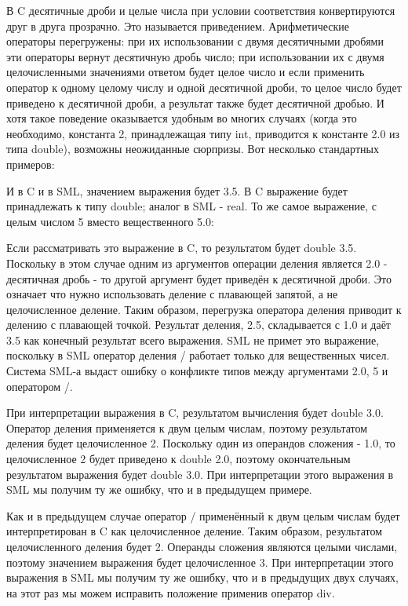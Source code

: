 В C десятичные дроби и целые числа при условии соответствия конвертируются друг в друга прозрачно. Это называется приведением. Арифметические операторы перегружены: при их использовании с двумя десятичными дробями эти операторы вернут десятичную дробь число; при использовании их с двумя целочисленными значениями ответом будет целое число и если применить оператор к одному целому числу и одной десятичной дроби, то целое число будет приведено к десятичной дроби, а результат также будет десятичной дробью. И хотя такое поведение оказывается удобным во многих случаях (когда это необходимо, константа 2, принадлежащая типу int, приводится к константе 2.0 из типа double), возможны неожиданные сюрпризы. Вот несколько стандартных примеров:

И в C и в SML, значением выражения будет 3.5. В C выражение будет принадлежать к типу double; аналог в SML - real. То же самое выражение, с целым числом 5 вместо вещественного 5.0:

Если рассматривать это выражение в C, то результатом будет double 3.5. Поскольку в этом случае одним из аргументов операции деления является 2.0 - десятичная дробь - то другой аргумент будет приведён к десятичной дроби. Это означает что нужно использовать деление с плавающей запятой, а не целочисленное деление. Таким образом, перегрузка оператора деления приводит к делению с плавающей точкой. Результат деления, 2.5, складывается с 1.0 и даёт 3.5 как конечный результат всего выражения. SML не примет это выражение, поскольку в SML оператор деления / работает только для вещественных чисел. Система SML-а выдаст ошибку о конфликте типов между аргументами 2.0, 5 и оператором /.

При интерпретации выражения в C, результатом вычисления будет double 3.0. Оператор деления применяется к двум целым числам, поэтому результатом деления будет целочисленное 2. Поскольку один из операндов сложения - 1.0, то целочисленное 2 будет приведено к double 2.0, поэтому окончательным результатом выражения будет double 3.0. При интерпретации этого выражения в SML мы получим ту же ошибку, что и в предыдущем  примере.

Как и в предыдущем случае оператор / применённый к двум целым числам будет интерпретирован в C как целочисленное деление. Таким образом, результатом целочисленного деления будет 2. Операнды сложения являются целыми числами, поэтому значением выражения будет целочисленное 3. При интерпретации этого выражения в SML мы получим ту же ошибку, что и в предыдущих двух случаях, на этот раз мы можем исправить положение применив оператор div.

